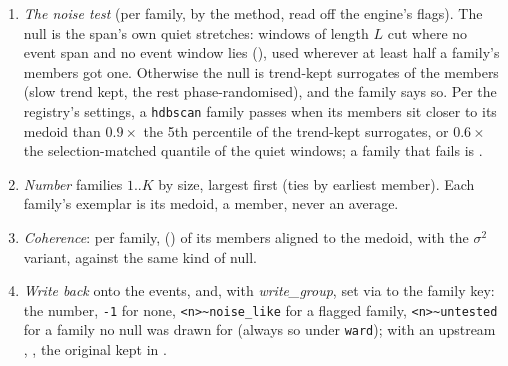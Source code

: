 \begin{enumerate}
\begin{itemize}
    its crowd.
  \item \texttt{kshape} \citep{paparrizos2015kshape}: $k$ families compared after sliding
    one shape along the other; $k = 0$ chooses $k$ from 2 to 12 by the best silhouette.
    Members further from their centre than 95\,\% of noise are left out as
     (at the default \emph{kshape\_omit\_d} = 0).
  \item \texttt{ward}: a hierarchical tree cut at \emph{ward\_cut}; every event placed
    unless further than \emph{ward\_omit\_d} from every family medoid. No noise test; refused
    above 5{,}000 windows (a square distance matrix).
  \end{itemize}
  The engine drops families under \emph{min\_group} members ().
  The details of each method are the Library's ().
\item \emph{The noise test} (per family, by the method, read off the engine's flags).
  The null is the span's own quiet stretches: windows of length $L$ cut where no event span
  and no event window lies (), used wherever at least half a family's
  members got one. Otherwise the null is trend-kept surrogates of the members (slow trend
  kept, the rest phase-randomised), and the family says so. Per the registry's settings, a
  \texttt{hdbscan} family passes when its members sit closer to its medoid than
  $0.9\times$ the 5th percentile of the trend-kept surrogates, or $0.6\times$ the
  selection-matched quantile of the quiet windows; a family that fails is
  . 
\item \emph{Number} families $1..K$ by size, largest first (ties by earliest member). Each
  family's exemplar is its medoid, a member, never an average.
\item \emph{Coherence}: per family,  ()
  of its members aligned to the medoid, with the $\sigma^2$ variant, against the same kind
  of null.
\item \emph{Write back} onto the events, and, with \emph{write\_group}, set  via
   to the family key: the number, \texttt{-1} for none,
  \texttt{<n>\textasciitilde noise\_like} for a flagged family,
  \texttt{<n>\textasciitilde untested} for a family no null was drawn for (always so under
  \texttt{ward}); with an upstream , , the original kept in
  .
\end{enumerate}

